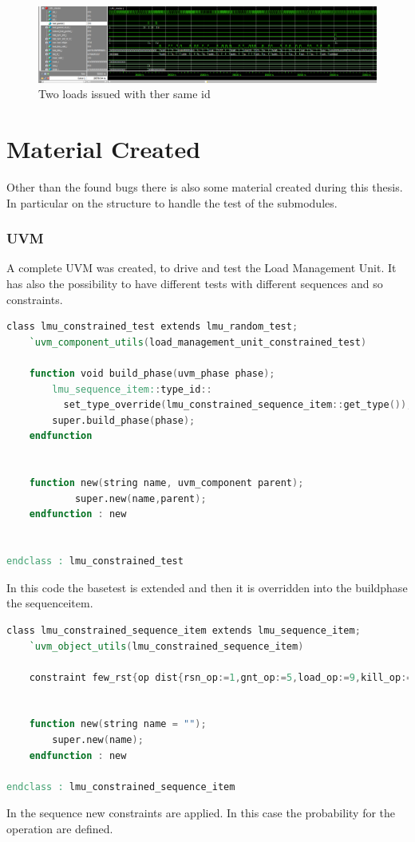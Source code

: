 \begin{figure}[H]
    \centering
    \includegraphics[scale = 0.25]{Chapter_3/img/2-loads.png}
    \caption{Two loads issued with ther same id}
    \label{2-loads}
\end{figure}


\section{Material Created}
Other than the found bugs there is also some material created during this thesis.
In particular on the structure to handle the test of the submodules.

\subsubsection{UVM}
A complete UVM was created, to drive and test the Load Management Unit. It has also the possibility to have different tests with different sequences and so constraints.

\linespread{1}
\begin{lstlisting}[language=Verilog,style=verilog-style, backgroundcolor=\color{lyel_palette}, frame=tlb]
class lmu_constrained_test extends lmu_random_test;
    `uvm_component_utils(load_management_unit_constrained_test)

	function void build_phase(uvm_phase phase);
		lmu_sequence_item::type_id::
		  set_type_override(lmu_constrained_sequence_item::get_type());
		super.build_phase(phase);
	endfunction


	function new(string name, uvm_component parent);
      		super.new(name,parent);
   	endfunction : new


endclass : lmu_constrained_test
\end{lstlisting}
\linespread{1.2}
In this code the base\+test is extended and then it is overridden into the build\+phase the sequence\+item.


\linespread{1}
\begin{lstlisting}[language=Verilog,style=verilog-style, backgroundcolor=\color{lyel_palette}, frame=tlb]
class lmu_constrained_sequence_item extends lmu_sequence_item;
	`uvm_object_utils(lmu_constrained_sequence_item)

	constraint few_rst{op dist{rsn_op:=1,gnt_op:=5,load_op:=9,kill_op:=2};}
	

	function new(string name = "");
		super.new(name);
	endfunction : new

endclass : lmu_constrained_sequence_item
\end{lstlisting}
\linespread{1.2}
In the sequence new constraints are applied. In this case the probability for the operation are defined.

